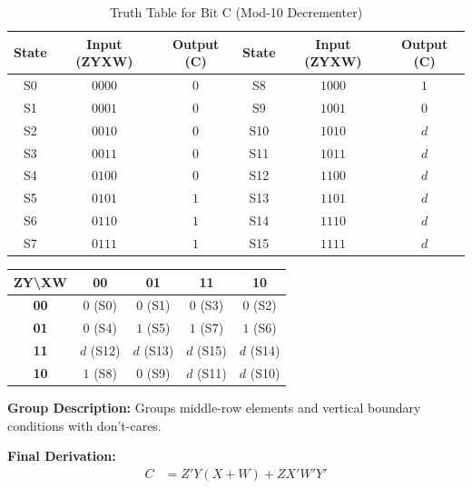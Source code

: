 \documentclass[journal,12pt,onecolumn]{IEEEtran}
\begin{document}
		\begin{table}[H]
			\centering
			\begin{tabular}{|c|c|c||c|c|c|}
				\hline
				\textbf{State} & \textbf{Input (ZYXW)} & \textbf{Output (C)} & \textbf{State} & \textbf{Input (ZYXW)} & \textbf{Output (C)} \\
				\hline
				S0 & $0000$ & $0$ & S8 & $1000$ & $1$ \\
				\hline
				S1 & $0001$ & $0$ & S9 & $1001$ & $0$ \\
				\hline
				S2 & $0010$ & $0$ & S10 & $1010$ & $d$ \\
				\hline
				S3 & $0011$ & $0$ & S11 & $1011$ & $d$ \\
				\hline
				S4 & $0100$ & $0$ & S12 & $1100$ & $d$ \\
				\hline
				S5 & $0101$ & $1$ & S13 & $1101$ & $d$ \\
				\hline
				S6 & $0110$ & $1$ & S14 & $1110$ & $d$ \\
				\hline
				S7 & $0111$ & $1$ & S15 & $1111$ & $d$ \\
				\hline
			\end{tabular}
			\caption{Truth Table for Bit C (Mod-10 Decrementer)}
		\end{table}
		
		\begin{table}[H]
			\centering
			\begin{tabular}{|c|c|c|c|c|}
				\hline
				\textbf{ZY\textbackslash XW} & \textbf{00} & \textbf{01} & \textbf{11} & \textbf{10} \\
				\hline
				\textbf{00} & $0$ (S0) & $0$ (S1) & $0$ (S3) & $0$ (S2) \\
				\hline
				\textbf{01} & $0$ (S4) & \cellcolor{grpRed}$1$ (S5) & \cellcolor{grpRed}$1$ (S7) & \cellcolor{grpRed}$1$ (S6) \\
				\hline
				\textbf{11} & \cellcolor{grpRed}$d$ (S12) & \cellcolor{grpRed}$d$ (S13) & \cellcolor{grpRed}$d$ (S15) & \cellcolor{grpRed}$d$ (S14) \\
				\hline
				\textbf{10} & \cellcolor{grpGreen}$1$ (S8) & $0$ (S9) & $d$ (S11) & $d$ (S10) \\
				\hline
			\end{tabular}
		\end{table}
		
		\begin{justify}
			\textbf{Group Description:} Groups middle-row elements and vertical boundary conditions with don't-cares.
			
			\textbf{Final Derivation:}
			\begin{align}
				C &= Z'Y(X + W) + ZX'W'Y'
			\end{align}
		\end{justify}
		
\end{document}
